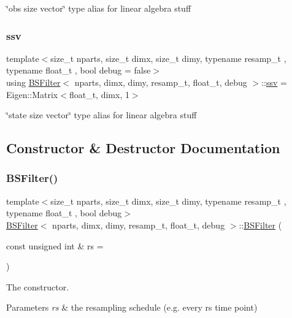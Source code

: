 \char`\"{}obs size vector\char`\"{} type alias for linear algebra stuff \mbox{\label{classBSFilter_ad2341b982bcdabc798d7ed0f327d28f7}} 
\subsubsection{\texorpdfstring{ssv}{ssv}}
{\footnotesize\ttfamily template$<$size\+\_\+t nparts, size\+\_\+t dimx, size\+\_\+t dimy, typename resamp\+\_\+t , typename float\+\_\+t , bool debug = false$>$ \\
using \hyperlink{classBSFilter}{B\+S\+Filter}$<$ nparts, dimx, dimy, resamp\+\_\+t, float\+\_\+t, debug $>$\+::\hyperlink{classBSFilter_ad2341b982bcdabc798d7ed0f327d28f7}{ssv} =  Eigen\+::\+Matrix$<$float\+\_\+t, dimx, 1$>$}

\char`\"{}state size vector\char`\"{} type alias for linear algebra stuff 

\subsection{Constructor \& Destructor Documentation}
\mbox{\label{classBSFilter_ab4cab4322cfd2f3f2ed1d4d9b8d058f7}} 
\subsubsection{\texorpdfstring{B\+S\+Filter()}{BSFilter()}}
{\footnotesize\ttfamily template$<$size\+\_\+t nparts, size\+\_\+t dimx, size\+\_\+t dimy, typename resamp\+\_\+t , typename float\+\_\+t , bool debug$>$ \\
\hyperlink{classBSFilter}{B\+S\+Filter}$<$ nparts, dimx, dimy, resamp\+\_\+t, float\+\_\+t, debug $>$\+::\hyperlink{classBSFilter}{B\+S\+Filter} (\begin{DoxyParamCaption}\item[{const unsigned int \&}]{rs = {} }\end{DoxyParamCaption})}



The constructor. 


\begin{DoxyParams}{Parameters}
{\em rs} & the resampling schedule (e.\+g. every rs time point) \\
\hline
\end{DoxyParams}


